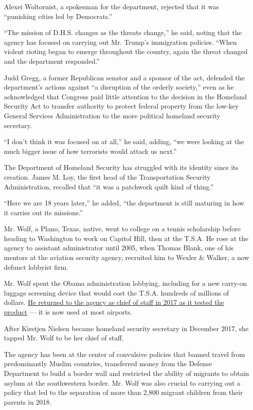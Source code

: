Alexei Woltornist, a spokesman for the department, rejected that it was
``punishing cities led by Democrats.''

``The mission of D.H.S. changes as the threats change,'' he said, noting
that the agency has focused on carrying out Mr. Trump's immigration
policies. ``When violent rioting began to emerge throughout the country,
again the threat changed and the department responded.''

Judd Gregg, a former Republican senator and a sponsor of the act,
defended the department's actions against ``a disruption of the orderly
society,'' even as he acknowledged that Congress paid little attention
to the decision in the Homeland Security Act to transfer authority to
protect federal property from the low-key General Services
Administration to the more political homeland security secretary.

``I don't think it was focused on at all,'' he said, adding, ``we were
looking at the much bigger issue of how terrorists would attack us
next.''

The Department of Homeland Security has struggled with its identity
since its creation. James M. Loy, the first head of the Transportation
Security Administration, recalled that ``it was a patchwork quilt kind
of thing.''

``Here we are 18 years later,'' he added, ``the department is still
maturing in how it carries out its missions.''

Mr. Wolf, a Plano, Texas, native, went to college on a tennis
scholarship before heading to Washington to work on Capitol Hill, then
at the T.S.A. He rose at the agency to assistant administrator until
2005, when Thomas Blank, one of his mentors at the aviation security
agency, recruited him to Wexler \& Walker, a now defunct lobbyist firm.

Mr. Wolf spent the Obama administration lobbying, including for a new
carry-on luggage screening device that would cost the T.S.A. hundreds of
millions of dollars.
\href{https://www.nytimes3xbfgragh.onion/2017/04/15/us/politics/trump-appointees-potential-conflicts.html}{He
returned to the agency as chief of staff in 2017 as it tested the
product} --- it is now used at most airports.

After Kirstjen Nielsen became homeland security secretary in December
2017, she tapped Mr. Wolf to be her chief of staff.

The agency has been at the center of convulsive policies that banned
travel from predominantly Muslim countries, transferred money from the
Defense Department to build a border wall and restricted the ability of
migrants to obtain asylum at the southwestern border. Mr. Wolf was also
crucial to carrying out a policy that led to the separation of more than
2,800 migrant children from their parents in 2018.

